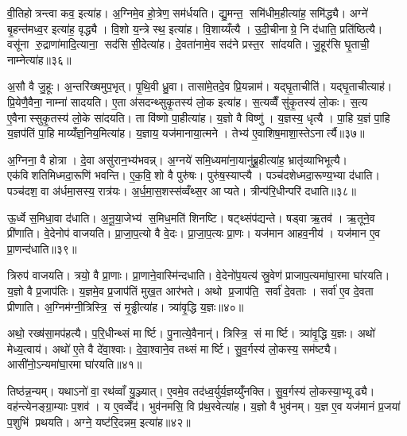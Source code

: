 वी॒तिहोत्रन्त्वा कव॒ इत्या॑ह। अ॒ग्निमे॒व हो॒त्रेण॒ सम॑र्धयति। द्यु॒मन्त॒ समि॑धीम॒हीत्या॑ह॒ समि॑द्ध्यै। अग्ने॑ बृ॒हन्त॑मध्व॒र इत्या॑ह॒ वृद्ध्यै। वि॒शो य॒न्त्रे स्थ॒ इत्या॑ह। वि॒शाय्यँत्यै। उ॒दी॒चीनाग्रे॒ नि द॑धाति॒ प्रति॑ष्ठित्यै। वसू॑ना रु॒द्राणा॑मादि॒त्याना॒ सद॑सि सी॒देत्या॑ह। दे॒वता॑नामे॒व सद॑ने प्रस्त॒र सा॑दयति। जु॒हूर॑सि घृ॒ताची॒ नाम्नेत्या॑ह॥३६॥

अ॒सौ वै जु॒हूः। अ॒न्तरि॑ख्षमुप॒भृत्। पृ॒थि॒वी ध्रु॒वा। तासा॑मे॒तदे॒व प्रि॒यन्नाम॑। यद्घृ॒ताचीति॑। यद्घृ॒ताचीत्याह॑। प्रि॒येणै॒वैना॒ नाम्ना॑ सादयति। ए॒ता अ॑सदन्थ्सुकृ॒तस्य॑ लो॒क इत्या॑ह। स॒त्यव्वैँ सु॑कृ॒तस्य॑ लो॒कः। स॒त्य ए॒वैनास्सुकृ॒तस्य॑ लो॒के सा॑दयति। ता वि॑ष्णो पा॒हीत्या॑ह। य॒ज्ञो वै विष्णु॑। य॒ज्ञस्य॒ धृत्यै। पा॒हि य॒ज्ञं पा॒हि य॒ज्ञप॑तिं पा॒हि माय्यँ॑ज्ञ॒निय॒मित्या॑ह। य॒ज्ञाय॒ यज॑मानाया॒त्मने। तेभ्य॑ ए॒वाशिष॒माशा॒स्तेऽनार्त्यै॥३७॥\anuvakamend[स्थेत्या॑ह पृथि॒वी वेदि॒र्यन्ति॑ क्रि॒यते॒ वीणु॑र्वी॒र्य॑संमितङ्करोत्याह पाति॒ नाम्नेत्या॑ह लो॒के सा॑दयति॒ षट् च॑]

अ॒ग्निना॒ वै होत्रा। दे॒वा असु॑रान॒भ्य॑भवन्न्। अ॒ग्नये॑ समि॒ध्यमा॑ना॒यानु॑ब्रू॒हीत्या॑ह॒ भ्रातृ॑व्याभिभूत्यै। एक॑विशतिमिध्मदा॒रूणि॑ भवन्ति। ए॒क॒वि॒शो वै पुरु॑षः। पुरु॑ष॒स्याप्त्यै। पञ्च॑दशेध्मदा॒रूण्य॒भ्या द॑धाति। पञ्च॑दश॒ वा अ॑र्धमा॒सस्य॒ रात्र॑यः। अ॒र्ध॒मा॒स॒शस्स॑व्वँथ्स॒र आप्यते। त्रीन्प॑रि॒धीन्परि॑ दधाति॥३८॥

ऊ॒र्ध्वे स॒मिधा॒वा द॑धाति। अ॒नू॒या॒जेभ्य॑ स॒मिध॒मति॑ शिनष्टि। षट्थ्संप॑द्यन्ते। षड्वा ऋ॒तव॑। ऋ॒तूने॒व प्री॑णाति। वे॒देनोप॑ वाजयति। प्रा॒जा॒प॒त्यो वै वे॒दः। प्रा॒जा॒प॒त्यः प्रा॒णः। यज॑मान आहव॒नीय॑। यज॑मान ए॒व प्रा॒णन्द॑धाति॥३९॥

त्रिरुप॑ वाजयति। त्रयो॒ वै प्रा॒णाः। प्रा॒णाने॒वास्मि॑न्दधाति। वे॒देनो॑प॒यत्य॑ स्रु॒वेण॑ प्राजाप॒त्यमा॑घा॒रमा घा॑रयति। य॒ज्ञो वै प्र॒जाप॑तिः। य॒ज्ञमे॒व प्र॒जाप॑तिं मुख॒त आर॑भते। अथो प्र॒जाप॑ति॒ सर्वा॑ दे॒वताः। सर्वा॑ ए॒व दे॒वता प्रीणाति। अ॒ग्निम॑ग्नी॒त्रिस्त्रि॒ सं मृ॒ड्ढीत्या॑ह। त्र्या॑वृ॒द्धि य॒ज्ञः॥४०॥

अथो॒ रख्ष॑सा॒मप॑हत्यै। प॒रि॒धीन्थ्सं मार्ष्टि। पु॒नात्ये॒वैनान्॑। त्रिस्त्रि॒ सं मार्ष्टि। त्र्या॑वृ॒द्धि य॒ज्ञः। अथो॑ मेध्य॒त्वाय॑। अथो॑ ए॒ते वै दे॑वा॒श्वाः। दे॒वा॒श्वाने॒व तथ्सं मार्ष्टि। सु॒व॒र्गस्य॑ लो॒कस्य॒ सम॑ष्ट्यै। आसी॑नो॒ऽन्यमा॑घा॒रमा घा॑रयति॥४१॥

तिष्ठ॑न्न॒न्यम्। यथाऽनो॑ वा॒ रथ॑व्वाँ यु॒ञ्ज्यात्। ए॒वमे॒व तद॑ध्व॒र्युर्य॒ज्ञय्युँ॑नक्ति। सु॒व॒र्गस्य॑ लो॒कस्या॒भ्यूढ्यै। वह॑न्त्येनङ्ग्रा॒म्याः प॒शव॑। य ए॒वव्वेँद॑। भुव॑नमसि॒ वि प्र॑थ॒स्वेत्या॑ह। य॒ज्ञो वै भुव॑नम्। य॒ज्ञ ए॒व यज॑मानं प्र॒जया॑ प॒शुभि॑ प्रथयति। अग्ने॒ यष्ट॑रि॒दन्नम॒ इत्या॑ह॥४२॥

